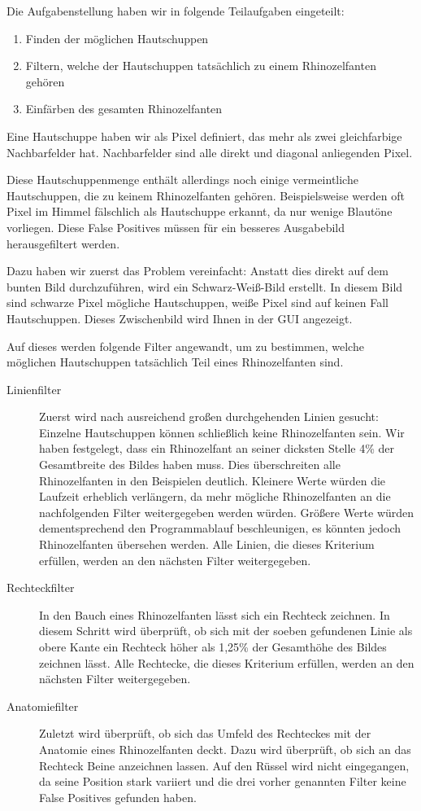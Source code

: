 Die Aufgabenstellung haben wir in folgende Teilaufgaben eingeteilt:
\begin{enumerate}
	\item Finden der möglichen Hautschuppen
	\item Filtern, welche der Hautschuppen tatsächlich zu einem Rhinozelfanten gehören
	\item Einfärben des gesamten Rhinozelfanten
\end{enumerate}

Eine Hautschuppe haben wir als Pixel definiert, das mehr als zwei gleichfarbige Nachbarfelder hat. Nachbarfelder sind alle direkt und diagonal anliegenden Pixel.

Diese Hautschuppenmenge enthält allerdings noch einige vermeintliche Hautschuppen, die zu keinem Rhinozelfanten gehören. Beispielsweise werden oft Pixel im Himmel fälschlich als Hautschuppe erkannt, da nur wenige Blautöne vorliegen. Diese False Positives müssen für ein besseres Ausgabebild herausgefiltert werden.

Dazu haben wir zuerst das Problem vereinfacht: Anstatt dies direkt auf dem bunten Bild durchzuführen, wird ein Schwarz-Weiß-Bild erstellt. In diesem Bild sind schwarze Pixel mögliche Hautschuppen, weiße Pixel sind auf keinen Fall Hautschuppen. Dieses Zwischenbild wird Ihnen in der GUI angezeigt.

Auf dieses werden folgende Filter angewandt, um zu bestimmen, welche möglichen Hautschuppen tatsächlich Teil eines Rhinozelfanten sind.

\begin{description}
	\item[Linienfilter] Zuerst wird nach ausreichend großen durchgehenden Linien gesucht: Einzelne Hautschuppen können schließlich keine Rhinozelfanten sein. Wir haben festgelegt, dass ein Rhinozelfant an seiner dicksten Stelle 4\% der Gesamtbreite des Bildes haben muss. Dies überschreiten alle Rhinozelfanten in den Beispielen deutlich. Kleinere Werte würden die Laufzeit erheblich verlängern, da mehr mögliche Rhinozelfanten an die nachfolgenden Filter weitergegeben werden würden. Größere Werte würden dementsprechend den Programmablauf beschleunigen, es könnten jedoch Rhinozelfanten übersehen werden. Alle Linien, die dieses Kriterium erfüllen, werden an den nächsten Filter weitergegeben.
	\item[Rechteckfilter] In den Bauch eines Rhinozelfanten lässt sich ein Rechteck zeichnen. In diesem Schritt wird überprüft, ob sich mit der soeben gefundenen Linie als obere Kante ein Rechteck höher als 1,25\% der Gesamthöhe des Bildes zeichnen lässt. Alle Rechtecke, die dieses Kriterium erfüllen, werden an den nächsten Filter weitergegeben.
	\item[Anatomiefilter] Zuletzt wird überprüft, ob sich das Umfeld des Rechteckes mit der Anatomie eines Rhinozelfanten deckt. Dazu wird überprüft, ob sich an das Rechteck Beine anzeichnen lassen. Auf den Rüssel wird nicht eingegangen, da seine Position stark variiert und die drei vorher genannten Filter keine False Positives gefunden haben.
\end{description}

